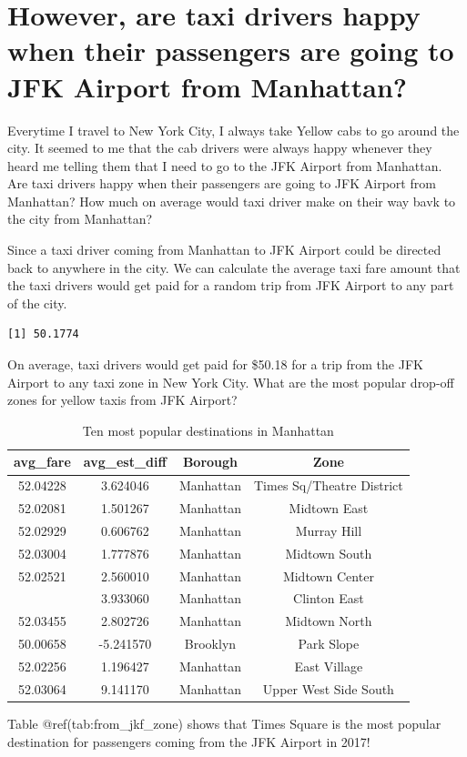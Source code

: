 \documentclass[12pt,twoside]{reedthesis}
\newenvironment{Shaded}{\begin{snugshade}}{\end{snugshade}}
\newcommand{\KeywordTok}[1]{\textcolor[rgb]{0.13,0.29,0.53}{\textbf{#1}}}
\newcommand{\OperatorTok}[1]{\textcolor[rgb]{0.81,0.36,0.00}{\textbf{#1}}}
\newcommand{\NormalTok}[1]{#1}
\theoremstyle{definition}
\theoremstyle{definition}
\theoremstyle{definition}
\theoremstyle{remark}
\begin{document}
\section{However, are taxi drivers happy when their passengers are going
to JFK Airport from
Manhattan?}\label{however-are-taxi-drivers-happy-when-their-passengers-are-going-to-jfk-airport-from-manhattan}

Everytime I travel to New York City, I always take Yellow cabs to go
around the city. It seemed to me that the cab drivers were always happy
whenever they heard me telling them that I need to go to the JFK Airport
from Manhattan. Are taxi drivers happy when their passengers are going
to JFK Airport from Manhattan? How much on average would taxi driver
make on their way bavk to the city from Manhattan?

Since a taxi driver coming from Manhattan to JFK Airport could be
directed back to anywhere in the city. We can calculate the average taxi
fare amount that the taxi drivers would get paid for a random trip from
JFK Airport to any part of the city.
\begin{Shaded}
\end{Shaded}
\begin{verbatim}
[1] 50.1774
\end{verbatim}
On average, taxi drivers would get paid for \$50.18 for a trip from the
JFK Airport to any taxi zone in New York City. What are the most popular
drop-off zones for yellow taxis from JFK Airport?
\begin{table}

\caption{\label{tab:unnamed-chunk-94}Ten most popular destinations in Manhattan}
\centering
\begin{tabular}[t]{cccc}
\toprule
avg\_fare & avg\_est\_diff & Borough & Zone\\
\midrule
52.04228 & 3.624046 & Manhattan & Times Sq/Theatre District\\
52.02081 & 1.501267 & Manhattan & Midtown East\\
52.02929 & 0.606762 & Manhattan & Murray Hill\\
52.03004 & 1.777876 & Manhattan & Midtown South\\
52.02521 & 2.560010 & Manhattan & Midtown Center\\
\addlinespace
52.05343 & 3.933060 & Manhattan & Clinton East\\
52.03455 & 2.802726 & Manhattan & Midtown North\\
50.00658 & -5.241570 & Brooklyn & Park Slope\\
52.02256 & 1.196427 & Manhattan & East Village\\
52.03064 & 9.141170 & Manhattan & Upper West Side South\\
\bottomrule
\end{tabular}
\end{table}
Table @ref(tab:from\_jkf\_zone) shows that Times Square is the most
popular destination for passengers coming from the JFK Airport in 2017!
\end{document}
